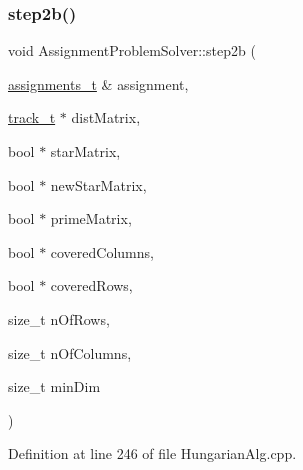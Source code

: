 \subsubsection{\texorpdfstring{step2b()}{step2b()}}
{\footnotesize\ttfamily void Assignment\+Problem\+Solver\+::step2b (\begin{DoxyParamCaption}\item[{\mbox{\hyperlink{_hungarian_alg_8h_ad7b9f569a9adbd958c668a36b6884ffd}{assignments\+\_\+t}} \&}]{assignment,  }\item[{\mbox{\hyperlink{defines_8h_a7ce9c8817b42ab418e61756f579549ab}{track\+\_\+t}} $\ast$}]{dist\+Matrix,  }\item[{bool $\ast$}]{star\+Matrix,  }\item[{bool $\ast$}]{new\+Star\+Matrix,  }\item[{bool $\ast$}]{prime\+Matrix,  }\item[{bool $\ast$}]{covered\+Columns,  }\item[{bool $\ast$}]{covered\+Rows,  }\item[{size\+\_\+t}]{n\+Of\+Rows,  }\item[{size\+\_\+t}]{n\+Of\+Columns,  }\item[{size\+\_\+t}]{min\+Dim }\end{DoxyParamCaption})\hspace{0.3cm}{\ttfamily [private]}}



Definition at line 246 of file Hungarian\+Alg.\+cpp.


